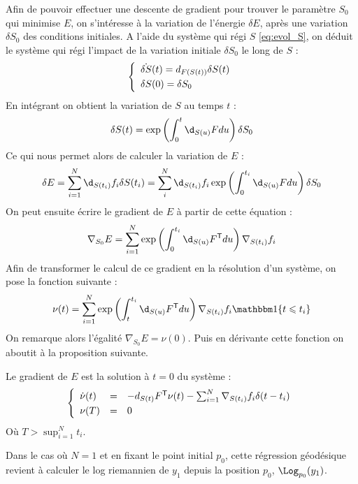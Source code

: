 Afin de pouvoir effectuer une descente de gradient pour trouver le paramètre $S_0$ qui minimise $E$, on s'intéresse à la variation de l'énergie $\delta E$, après une variation $\delta S_0$ des conditions initiales. A l'aide du système qui régi $S$ \eqref{eq:evol_S}, on déduit le système qui régi l'impact de la variation initiale $\delta S_0$ le long de $S$ :
\begin{equation}
\label{eq:evol_dS}
\syst{lll}{
	\dot{\delta S}(t) = d_{F(S(t))} \delta S(t) \\[1mm]
	\delta S(0) = \delta S_0
}
\end{equation}
En intégrant on obtient la variation de $S$ au temps $t$ :
\begin{equation}
	\label{eq:dS}
	\delta S(t) = \exp \left( \int_0^{t} \d_{S(u)} F du \right) \delta S_0
\end{equation}
Ce qui nous permet alors de calculer la variation de $E$ :
\begin{equation}
	\label{eq:deltaEreg}
	\delta E = \sum_{i=1}^N \d_{S(t_i)} f_i \delta S(t_i) = \sum_{i}^N \d_{S(t_i)} f_i \exp \left( \int_0^{t_i} \d_{S(u)} F du \right) \delta S_0
\end{equation}
On peut ensuite écrire le gradient de $E$ à partir de cette équation :
\begin{equation}
	\nabla_{S_0} E = \sum_{i=1}^N \exp \left( \int_0^{t_i} \d_{S(u)} F^\trans du \right) \nabla_{S(t_i)} f_i
\end{equation}
Afin de transformer le calcul de ce gradient en la résolution d'un système, on pose la fonction suivante :
\begin{equation}
	\nu(t) = \sum_{i=1}^N \exp \left( \int_t^{t_i} \d_{S(u)} F^\trans du \right) \nabla_{S(t_i)} f_i \ind \{ t \leqslant t_i \}
\end{equation}
On remarque alors l'égalité $\nabla_{S_0} E = \nu(0)$. Puis en dérivante cette fonction on aboutit à la proposition suivante.

\begin{proposition}
	\label{def:gradE1}
	Le gradient de $E$ est la solution à $t=0$ du système :
	\begin{equation}
		\syst{lll}{
			\dot{\nu}(t) & = & - d_{S(t)} F^\trans \nu(t) - \sum_{i=1}^N \nabla_{S(t_i)} f_i \delta (t - t_i) \\[1mm]
			\nu(T) & = & 0
		}
	\end{equation}
	Où $T > \sup_{i = 1}^N t_i$.
\end{proposition}

\begin{remarque}
	Dans le cas où $N=1$ et en fixant le point initial $p_0$, cette régression géodésique revient à calculer le log riemannien de $y_1$ depuis la position $p_0$, $\Log_{p_0}(y_1)$.
\end{remarque}

